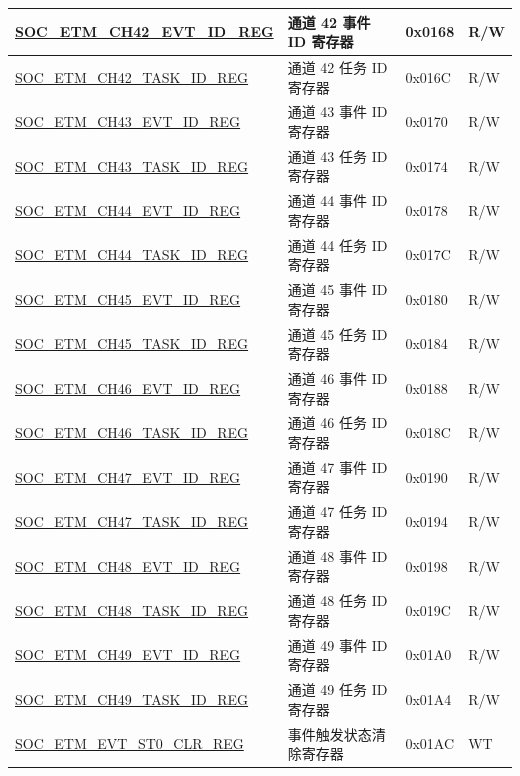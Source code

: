 \begin{longtable}{ | p{6cm} | p{6.2cm} | p{1.3cm} | p{2cm} | }
\hyperref[regdesc:SOCETMCHNEVTIDREG]{SOC\_ETM\_CH42\_EVT\_ID\_REG} & 通道 42 事件 ID 寄存器 & 0x0168 & R/W \\ \hline
\hyperref[regdesc:SOCETMCHNTASKIDREG]{SOC\_ETM\_CH42\_TASK\_ID\_REG} & 通道 42 任务 ID 寄存器 & 0x016C & R/W \\ \hline
\hyperref[regdesc:SOCETMCHNEVTIDREG]{SOC\_ETM\_CH43\_EVT\_ID\_REG} & 通道 43 事件 ID 寄存器 & 0x0170 & R/W \\ \hline
\hyperref[regdesc:SOCETMCHNTASKIDREG]{SOC\_ETM\_CH43\_TASK\_ID\_REG} & 通道 43 任务 ID 寄存器 & 0x0174 & R/W \\ \hline
\hyperref[regdesc:SOCETMCHNEVTIDREG]{SOC\_ETM\_CH44\_EVT\_ID\_REG} & 通道 44 事件 ID 寄存器 & 0x0178 & R/W \\ \hline
\hyperref[regdesc:SOCETMCHNTASKIDREG]{SOC\_ETM\_CH44\_TASK\_ID\_REG} & 通道 44 任务 ID 寄存器 & 0x017C & R/W \\ \hline
\hyperref[regdesc:SOCETMCHNEVTIDREG]{SOC\_ETM\_CH45\_EVT\_ID\_REG} & 通道 45 事件 ID 寄存器 & 0x0180 & R/W \\ \hline
\hyperref[regdesc:SOCETMCHNTASKIDREG]{SOC\_ETM\_CH45\_TASK\_ID\_REG} & 通道 45 任务 ID 寄存器 & 0x0184 & R/W \\ \hline
\hyperref[regdesc:SOCETMCHNEVTIDREG]{SOC\_ETM\_CH46\_EVT\_ID\_REG} & 通道 46 事件 ID 寄存器 & 0x0188 & R/W \\ \hline
\hyperref[regdesc:SOCETMCHNTASKIDREG]{SOC\_ETM\_CH46\_TASK\_ID\_REG} & 通道 46 任务 ID 寄存器 & 0x018C & R/W \\ \hline
\hyperref[regdesc:SOCETMCHNEVTIDREG]{SOC\_ETM\_CH47\_EVT\_ID\_REG} & 通道 47 事件 ID 寄存器 & 0x0190 & R/W \\ \hline
\hyperref[regdesc:SOCETMCHNTASKIDREG]{SOC\_ETM\_CH47\_TASK\_ID\_REG} & 通道 47 任务 ID 寄存器 & 0x0194 & R/W \\ \hline
\hyperref[regdesc:SOCETMCHNEVTIDREG]{SOC\_ETM\_CH48\_EVT\_ID\_REG} & 通道 48 事件 ID 寄存器 & 0x0198 & R/W \\ \hline
\hyperref[regdesc:SOCETMCHNTASKIDREG]{SOC\_ETM\_CH48\_TASK\_ID\_REG} & 通道 48 任务 ID 寄存器 & 0x019C & R/W \\ \hline
\hyperref[regdesc:SOCETMCHNEVTIDREG]{SOC\_ETM\_CH49\_EVT\_ID\_REG} & 通道 49 事件 ID 寄存器 & 0x01A0 & R/W \\ \hline
\hyperref[regdesc:SOCETMCHNTASKIDREG]{SOC\_ETM\_CH49\_TASK\_ID\_REG} & 通道 49 任务 ID 寄存器 & 0x01A4 & R/W \\ \hline
\hyperref[regdesc:SOCETMEVTST0CLRREG]{SOC\_ETM\_EVT\_ST0\_CLR\_REG} & 事件触发状态清除寄存器 & 0x01AC & WT \\ \hline

\end{longtable}
